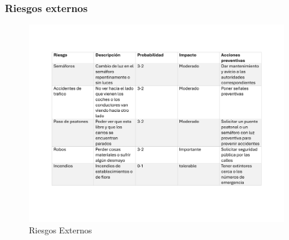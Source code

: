 \subsubsection{Riesgos externos}
\begin{figure}[H]
    \centering
    \includegraphics[scale=0.3]{13/img/riesgoExternos.pdf}
    \caption{Riesgos Externos}
\end{figure}
% 
% 
% 
% 
